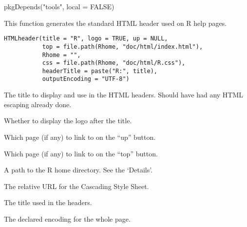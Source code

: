 %
\begin{SeeAlso}\relax
{}
\end{SeeAlso}
%
\begin{Examples}
\begin{ExampleCode}
pkgDepends("tools", local = FALSE)
\end{ExampleCode}
\end{Examples}
%
\begin{Description}\relax
This function generates the standard HTML header used on R help pages.
\end{Description}
%
\begin{Usage}
\begin{verbatim}
HTMLheader(title = "R", logo = TRUE, up = NULL,
           top = file.path(Rhome, "doc/html/index.html"), 
           Rhome = "",
           css = file.path(Rhome, "doc/html/R.css"),
           headerTitle = paste("R:", title),
           outputEncoding = "UTF-8")
\end{verbatim}
\end{Usage}
%
\begin{Arguments}
\begin{ldescription}
\item[\code{title}] 
The title to display and use in the HTML headers.  Should have had any
HTML escaping already done.

\item[\code{logo}] 
Whether to display the \R{} logo after the title.

\item[\code{up}] 
Which page (if any) to link to on the ``up'' button.

\item[\code{top}] 
Which page (if any) to link to on the ``top'' button.

\item[\code{Rhome}] 
A  path to the R home directory.  See the `Details'.

\item[\code{css}] 
The relative URL for the Cascading Style Sheet.

\item[\code{headerTitle}] 
The title used in the headers.

\item[\code{outputEncoding}] 
The declared encoding for the whole page.

\end{ldescription}
\end{Arguments}
